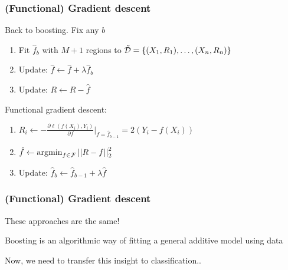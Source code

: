 \documentclass[12pt]{beamer}
\begin{document}
\begin{frame}[fragile]
\frametitle{(Functional) Gradient descent}
 Back to boosting.  Fix any $b$
\vsp


\begin{enumerate}
\item Fit $\hat f_b$ with $M+1$ regions to $\tilde{\mathcal{D}} = \{ (X_1, R_1),\ldots,(X_n,R_n)\}$
\item Update: $\hat f \leftarrow \hat f + \lambda \hat{f}_b$
\item Update: $R \leftarrow R - \hat{f}$
\end{enumerate}
\vsp

 Functional gradient descent:
\begin{enumerate}
\item $R_i \leftarrow  - \frac{\partial \ell(f(X_i),Y_i)}{\partial f}\bigg|_{f = \hat{f}_{b-1}}
=
2 ( Y_i - f(X_i))$
\item $\hat{f}  \leftarrow \operatorname*{\arg\!\min}_{f\in\mathcal{F}} \left|\left| R - f \right|\right|_2^2$

\item Update: $\hat{f}_b \leftarrow \hat{f}_{b-1} + \lambda \hat{f}$
\end{enumerate}

\end{frame}

\begin{frame}[fragile]
\frametitle{(Functional) Gradient descent}
 These approaches are the same!

\vsp
Boosting is an algorithmic way of fitting a general additive model using data

\vsp
Now, we need to transfer this insight to classification..
\end{frame}
\end{document}
